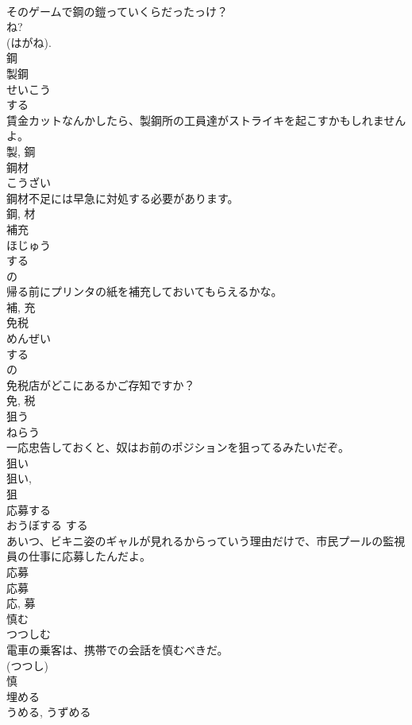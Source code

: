 \documentclass[8pt]{extreport}
\begin{document}
\begin{CJK}{UTF8}{min}
\\	そのゲームで鋼の鎧っていくらだったっけ？	
\\	ね?
\\	(はがね). 
\\	鋼	
\\	製鋼	
\\	せいこう	
\\	する 
\\	賃金カットなんかしたら、製鋼所の工員達がストライキを起こすかもしれませんよ。	
\\	製, 鋼	
\\	鋼材	
\\	こうざい	
\\	鋼材不足には早急に対処する必要があります。	
\\	鋼, 材	
\\	補充	
\\	ほじゅう	
\\	する 
\\	の 
\\	帰る前にプリンタの紙を補充しておいてもらえるかな。	
\\	補, 充	
\\	免税	
\\	めんぜい	
\\	する 
\\	の 
\\	免税店がどこにあるかご存知ですか？	
\\	免, 税	
\\	狙う	
\\	ねらう	
\\	一応忠告しておくと、奴はお前のポジションを狙ってるみたいだぞ。	
\\	狙い 
\\	狙い, 
\\	狙	
\\	応募する	
\\	おうぼする	する 
\\	あいつ、ビキニ姿のギャルが見れるからっていう理由だけで、市民プールの監視員の仕事に応募したんだよ。	
\\	応募 
\\	応募
\\	応, 募	
\\	慎む	
\\	つつしむ	
\\	電車の乗客は、携帯での会話を慎むべきだ。	
\\	(つつし) 
\\	慎	
\\	埋める	
\\	うめる, うずめる	

\end{CJK}
\end{document}
